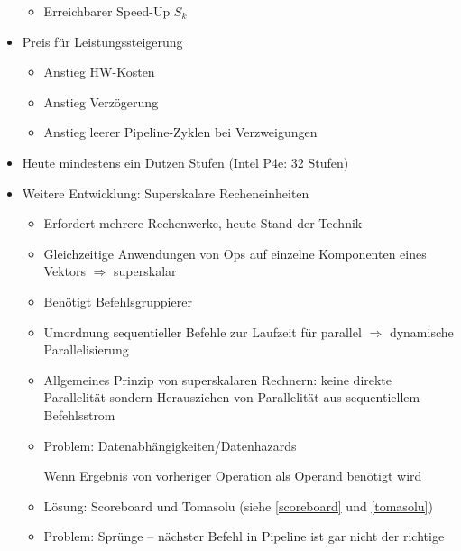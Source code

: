 \begin{itemize}
\begin{itemize}
			\item
				Erreichbarer Speed-Up $S_k$

		\end{itemize}
	\item
		Preis für Leistungssteigerung
		\begin{itemize}
			\item
				Anstieg HW-Kosten
			\item
				Anstieg Verzögerung
			\item
				Anstieg leerer Pipeline-Zyklen bei Verzweigungen
		\end{itemize}
	\item
		Heute mindestens ein Dutzen Stufen (Intel P4e: 32 Stufen)
	\item
		Weitere Entwicklung: Superskalare Recheneinheiten
		\begin{itemize}
			\item
				Erfordert mehrere Rechenwerke, heute Stand der Technik
			\item
				Gleichzeitige Anwendungen von Ops auf einzelne Komponenten eines Vektors $\Rightarrow$ superskalar
			\item
				Benötigt Befehlsgruppierer
			\item
				Umordnung sequentieller Befehle zur Laufzeit für parallel $\Rightarrow$ dynamische Parallelisierung
			\item
				Allgemeines Prinzip von superskalaren Rechnern: keine direkte Parallelität sondern Herausziehen von Parallelität aus sequentiellem Befehlsstrom
			\item
				Problem: Datenabhängigkeiten/Datenhazards

				Wenn Ergebnis von vorheriger Operation als Operand benötigt wird
			\item
				Lösung: Scoreboard und Tomasolu (siehe \ref{scoreboard} und \ref{tomasolu})
			\item
				Problem: Sprünge -- nächster Befehl in Pipeline ist gar nicht der richtige
				
		\end{itemize}

\end{itemize}

